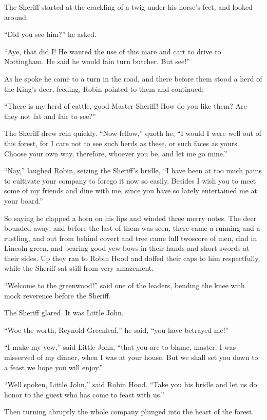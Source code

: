 The Sheriff started at the crackling of a twig under his horse's feet,
and looked around.

``Did you see him?'' he asked.

``Aye, that did I! He wanted the use of this mare and cart to drive to
Nottingham. He said he would fain turn butcher. But see!''

As he spoke he came to a turn in the road, and there before them stood a
herd of the King's deer, feeding. Robin pointed to them and continued:

``There is my herd of cattle, good Master Sheriff! How do you like them?
Are they not fat and fair to see?''

The Sheriff drew rein quickly. ``Now fellow,'' quoth he, ``I would I
were well out of this forest, for I care not to see such herds as these,
or such faces as yours. Choose your own way, therefore, whoever you be,
and let me go mine.''

``Nay,'' laughed Robin, seizing the Sheriff's bridle, ``I have been at
too much pains to cultivate your company to forego it now so easily.
Besides I wish you to meet some of my friends and dine with me, since
you have so lately entertained me at your board.''

So saying he clapped a horn on his lips and winded three merry notes.
The deer bounded away; and before the last of them was seen, there came
a running and a rustling, and out from behind covert and tree came full
twoscore of men, clad in Lincoln green, and bearing good yew bows in
their hands and short swords at their sides. Up they ran to Robin Hood
and doffed their caps to him respectfully, while the Sheriff sat still
from very amazement.

``Welcome to the greenwood!'' said one of the leaders, bending the knee
with mock reverence before the Sheriff.

The Sheriff glared. It was Little John.

``Woe the worth, Reynold Greenleaf,'' he said, ``you have betrayed me!''

``I make my vow,'' said Little John, ``that you are to blame, master. I
was misserved of my dinner, when I was at your house. But we shall set
you down to a feast we hope you will enjoy.''

``Well spoken, Little John,'' said Robin Hood. ``Take you his bridle and
let us do honor to the guest who has come to feast with us.''

Then turning abruptly the whole company plunged into the heart of the
forest.

